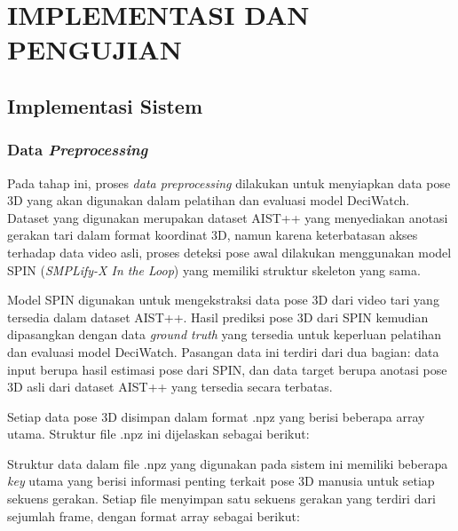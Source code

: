\chapter{IMPLEMENTASI DAN PENGUJIAN}
\vspace{1em}
\section{Implementasi Sistem}
\subsection{Data \textit{Preprocessing}}
Pada tahap ini, proses \textit{data preprocessing} dilakukan untuk menyiapkan data pose 3D yang akan digunakan dalam pelatihan dan evaluasi model DeciWatch. Dataset yang digunakan merupakan dataset AIST++ yang menyediakan anotasi gerakan tari dalam format koordinat 3D, namun karena keterbatasan akses terhadap data video asli, proses deteksi pose awal dilakukan menggunakan model SPIN (\textit{SMPLify-X In the Loop}) yang memiliki struktur skeleton yang sama.

Model SPIN digunakan untuk mengekstraksi data pose 3D dari video tari yang tersedia dalam dataset AIST++. Hasil prediksi pose 3D dari SPIN kemudian dipasangkan dengan data \textit{ground truth} yang tersedia untuk keperluan pelatihan dan evaluasi model DeciWatch. Pasangan data ini terdiri dari dua bagian: data input berupa hasil estimasi pose dari SPIN, dan data target berupa anotasi pose 3D asli dari dataset AIST++ yang tersedia secara terbatas.

Setiap data pose 3D disimpan dalam format {.npz} yang berisi beberapa array utama. Struktur file {.npz} ini dijelaskan sebagai berikut:

Struktur data dalam file {.npz} yang digunakan pada sistem ini memiliki beberapa \textit{key} utama yang berisi informasi penting terkait pose 3D manusia untuk setiap sekuens gerakan. Setiap file menyimpan satu sekuens gerakan yang terdiri dari sejumlah frame, dengan format array sebagai berikut:

